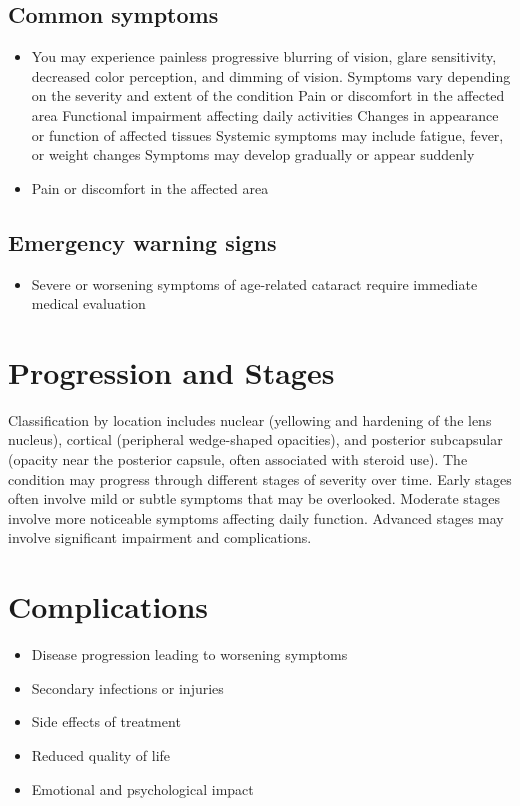 \subsection{Common symptoms}
\begin{itemize}[noitemsep]
  \item You may experience painless progressive blurring of vision, glare sensitivity, decreased color perception, and dimming of vision. Symptoms vary depending on the severity and extent of the condition Pain or discomfort in the affected area Functional impairment affecting daily activities Changes in appearance or function of affected tissues Systemic symptoms may include fatigue, fever, or weight changes Symptoms may develop gradually or appear suddenly
  \item Pain or discomfort in the affected area
  \end{itemize}

\subsection{Emergency warning signs}
\begin{itemize}[noitemsep]
  \item Severe or worsening symptoms of age-related cataract require immediate medical evaluation
\end{itemize}
\section{Progression and Stages}
Classification by location includes nuclear (yellowing and hardening of the lens nucleus), cortical (peripheral wedge-shaped opacities), and posterior subcapsular (opacity near the posterior capsule, often associated with steroid use). The condition may progress through different stages of severity over time. Early stages often involve mild or subtle symptoms that may be overlooked. Moderate stages involve more noticeable symptoms affecting daily function. Advanced stages may involve significant impairment and complications.
\section{Complications}
\begin{itemize}[noitemsep]
  \item Disease progression leading to worsening symptoms
  \item Secondary infections or injuries
  \item Side effects of treatment
  \item Reduced quality of life
  \item Emotional and psychological impact
\end{itemize}

